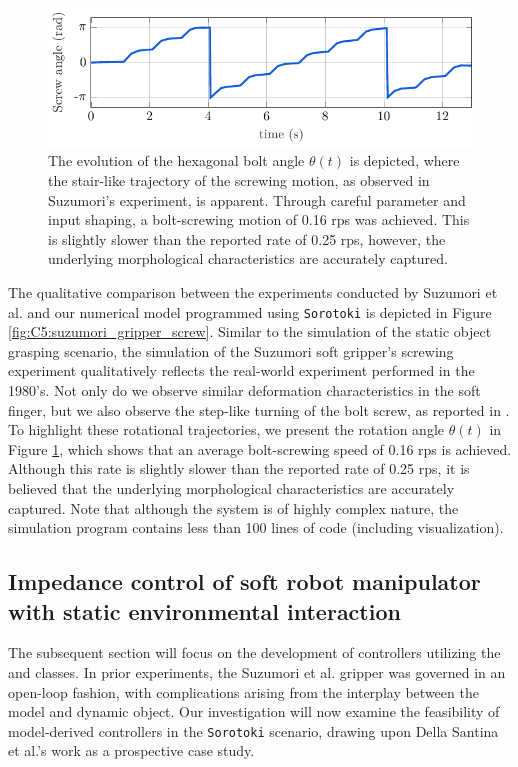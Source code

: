 %
\begin{figure}[!b]
    \centering
    \vspace{-3mm}
    \includegraphics*[width=.95\textwidth]{./pdf/thesis-figure-6-28.pdf}
    \caption{\small The evolution of the hexagonal bolt angle $\theta(t)$ is depicted, where the stair-like trajectory of the screwing motion, as observed in Suzumori's experiment, is apparent. Through careful parameter and input shaping, a bolt-screwing motion of 0.16 rps was achieved. This is slightly slower than the reported rate of 0.25 rps, however, the underlying morphological characteristics are accurately captured.}
    \label{fig:C5:suzumori_gripper_screw_states}
\end{figure}

The qualitative comparison between the experiments conducted by Suzumori et al. \cite{Suzumori1991,Suzumori1992} and our numerical model programmed using \texttt{Sorotoki} is depicted in Figure \ref{fig:C5:suzumori_gripper_screw}. Similar to the simulation of the static object grasping scenario, the simulation of the Suzumori soft gripper's screwing experiment qualitatively reflects the real-world experiment performed in the 1980's. Not only do we observe similar deformation characteristics in the soft finger, but we also observe the step-like turning of the bolt screw, as reported in \cite{Suzumori1992}. To highlight these rotational trajectories, we present the rotation angle $\theta(t)$ in Figure \ref{fig:C5:suzumori_gripper_screw_states}, which shows that an average bolt-screwing speed of 0.16 rps is achieved. Although this rate is slightly slower than the reported rate of 0.25 rps, it is believed that the underlying morphological characteristics are accurately captured. Note that although the system is of highly complex nature, the simulation program contains less than 100 lines of code (including visualization).

\subsection[Environmental impedance control of soft manipulator]{Impedance control of soft robot manipulator with static environmental interaction}
The subsequent section will focus on the development of controllers utilizing the  and  classes. In prior experiments, the Suzumori et al. gripper was governed in an open-loop fashion, with complications arising from the interplay between the model and dynamic object. Our investigation will now examine the feasibility of model-derived controllers in the \texttt{Sorotoki} scenario, drawing upon Della Santina et al.'s work \cite{DellaSantina2020a} as a prospective case study.

